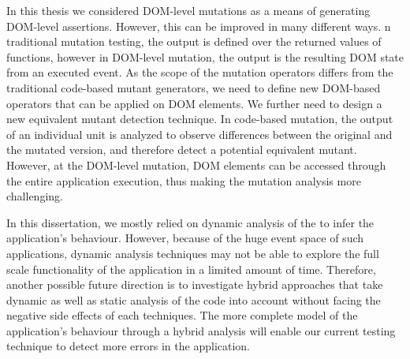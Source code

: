 In this thesis we considered DOM-level mutations as a means of generating DOM-level assertions. However, this can be improved in many different ways. n traditional mutation testing, the output is defined over the returned values of functions, however in DOM-level mutation, the output is the resulting DOM state from an executed event. As the scope of the mutation operators differs from the traditional code-based mutant generators, we need to define new DOM-based operators that can be applied on DOM elements. We further need to design a new equivalent mutant detection technique. In code-based mutation, the output of an individual unit is analyzed to observe differences between the original and the mutated version, and therefore detect a potential equivalent mutant. However, at the DOM-level mutation, DOM elements can be accessed through the entire application execution, thus making the mutation analysis more challenging.

In this dissertation, we mostly relied on dynamic analysis of the \javascript to infer the application's behaviour. However, because of the huge event space of such applications, dynamic analysis techniques may not be able to explore the full scale functionality of the application in a limited amount of time. Therefore, another possible future direction is to investigate hybrid approaches that take dynamic as well as static analysis of the code into account without facing the negative side effects of each techniques. The more complete model of the application's behaviour through a hybrid analysis will enable our current testing technique to detect more errors in the application.  



